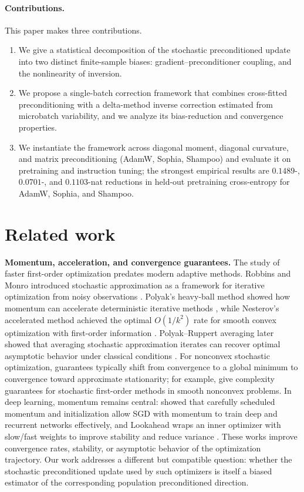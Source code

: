 \documentclass{article}
\begin{document}
\paragraph{Contributions.}
This paper makes three contributions.
\begin{enumerate}
    \item We give a statistical decomposition of the stochastic preconditioned update into two distinct finite-sample biases: gradient--preconditioner coupling, and the nonlinearity of inversion.
    \item We propose a single-batch correction framework that combines cross-fitted preconditioning with a delta-method inverse correction estimated from microbatch variability, and we analyze its bias-reduction and convergence properties.
    \item We instantiate the framework across diagonal moment, diagonal curvature, and matrix preconditioning (AdamW, Sophia, Shampoo) and evaluate it on pretraining and instruction tuning; the strongest empirical results are $0.1489$-, $0.0701$-, and $0.1103$-nat reductions in held-out pretraining cross-entropy for AdamW, Sophia, and Shampoo.
\end{enumerate}

\section{Related work}
\label{sec:related-work}

\textbf{Momentum, acceleration, and convergence guarantees.}
The study of faster first-order optimization predates modern adaptive methods. Robbins and Monro introduced stochastic approximation as a framework for iterative optimization from noisy observations \citep{robbins1951stochastic}. Polyak's heavy-ball method showed how momentum can accelerate deterministic iterative methods \citep{polyak1964some}, while Nesterov's accelerated method achieved the optimal $O(1/k^2)$ rate for smooth convex optimization with first-order information \citep{nesterov1983method}. Polyak--Ruppert averaging later showed that averaging stochastic approximation iterates can recover optimal asymptotic behavior under classical conditions \citep{polyak1992acceleration}. For nonconvex stochastic optimization, guarantees typically shift from convergence to a global minimum to convergence toward approximate stationarity; for example, \citet{ghadimi2013stochastic} give complexity guarantees for stochastic first-order methods in smooth nonconvex problems. In deep learning, momentum remains central: \citet{sutskever2013importance} showed that carefully scheduled momentum and initialization allow SGD with momentum to train deep and recurrent networks effectively, and Lookahead wraps an inner optimizer with slow/fast weights to improve stability and reduce variance \citep{zhang2019lookahead}. These works improve convergence rates, stability, or asymptotic behavior of the optimization trajectory. Our work addresses a different but compatible question: whether the stochastic preconditioned update used by such optimizers is itself a biased estimator of the corresponding population preconditioned direction.
\end{document}
